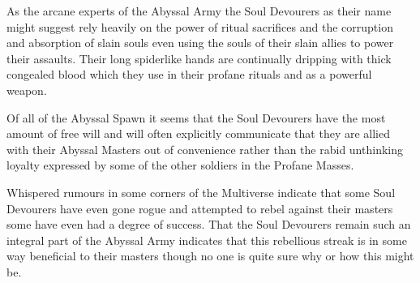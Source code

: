 {{As the arcane experts of the Abyssal Army\comma{} the Soul Devourers\comma{} as their name might suggest\comma{} rely heavily on the power of ritual sacrifices and the corruption and absorption of slain souls\comma{} even using the souls of their slain allies to power their assaults. Their long\comma{} spider\minus{}like hands are continually dripping with thick\comma{} congealed blood which they use in their profane rituals\comma{} and as a powerful weapon. 

Of all of the Abyssal Spawn\comma{} it seems that the Soul Devourers have the most amount of free will\comma{} and will often explicitly communicate that they are allied with their Abyssal Masters out of convenience\comma{} rather than the rabid\comma{} unthinking loyalty expressed by some of the other soldiers in the Profane Masses. 

Whispered rumours in some corners of the Multiverse indicate that some Soul Devourers have even gone rogue\comma{} and attempted to rebel against their masters\comma{} some have even had a degree of success. That the Soul Devourers remain such an integral part of the Abyssal Army indicates that this rebellious streak is in some way beneficial to their masters\comma{} though no one is quite sure why or how this might be.}


}
